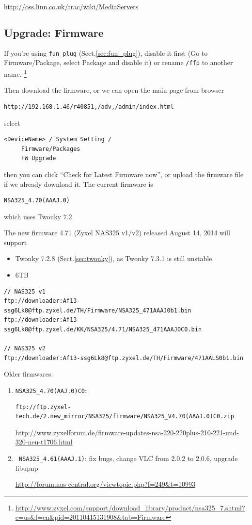 \url{http://oss.linn.co.uk/trac/wiki/MediaServers}



\subsection{Upgrade: Firmware}
\label{sec:nas_zyxel_firmware}

If you're using \verb!fun_plug! (Sect.\ref{sec:fun_plug}), disable it first (Go
to Firmware/Package, select Package and disable it) or rename \verb!/ffp! to
another name.
\footnote{\url{http://www.zyxel.com/support/download_library/product/nsa325_7.shtml?c=us&l=en&pid=20110415131908&tab=Firmware}}
 

Then download the firmware, or we can open the main page from browser
\begin{verbatim}
http://192.168.1.46/r40851,/adv,/admin/index.html
\end{verbatim}
select 
\begin{verbatim}
<DeviceName> / System Setting / 
     Firmware/Packages
     FW Upgrade
\end{verbatim}
then you can click ``Check for Latest Firmware now'', or upload the firmware
file if we already download it. The current firmware is 
\begin{verbatim}
NSA325_4.70(AAAJ.0)
\end{verbatim}
which uses Twonky 7.2.

The new firmware 4.71 (Zyxel NAS325 v1/v2) released  August 14, 2014 will
support
\begin{itemize}
  \item Twonky 7.2.8 (Sect.\ref{sec:twonky}), as Twonky 7.3.1 is still unstable.
  \item 6TB 
\end{itemize}

\begin{verbatim}
// NAS325 v1
ftp://downloader:Af13-ssg6Lk8@ftp.zyxel.de/TH/Firmware/NSA325_471AAAJ0b1.bin
ftp://downloader:Af13-ssg6Lk8@ftp.zyxel.de/KK/NSA325/4.71/NSA325_471AAAJ0C0.bin

// NAS325 v2
ftp://downloader:Af13-ssg6Lk8@ftp.zyxel.de/TH/Firmware/471AALS0b1.bin
\end{verbatim}

Older firmwares:
\begin{enumerate}
  \item \verb!NSA325_4.70(AAJ.0)C0!:
\begin{verbatim}
ftp://ftp.zyxel-tech.de/2.new_mirror/NSA325/firmware/NSA325_V4.70(AAAJ.0)C0.zip
\end{verbatim}   
  
  \url{http://www.zyxelforum.de/firmware-updates-nsa-220-220plus-210-221-und-320-neu-t1706.html}
  
  \item \verb! NSA325_4.61(AAAJ.1)!: fix bugs, change VLC from 2.0.2 to  2.0.6,
  upgrade libupnp
  
  
  \url{http://forum.nas-central.org/viewtopic.php?f=249&t=10993}
  
  
\end{enumerate}


